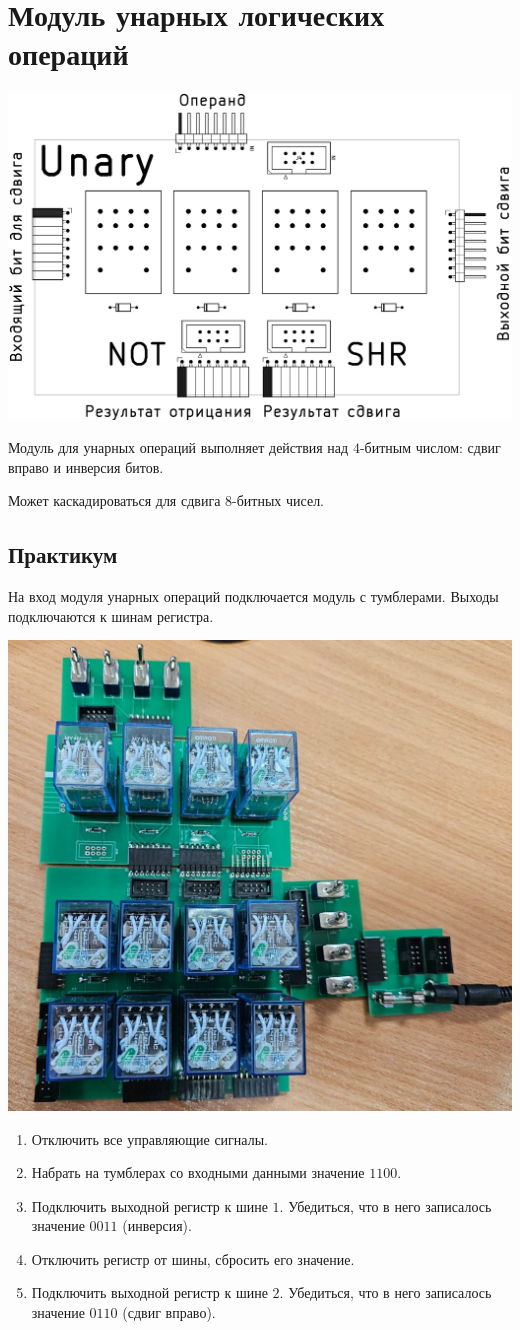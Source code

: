 \section{Модуль унарных логических операций}

\begin{center}
\includegraphics{boards/logic_unary.png}
\end{center}

Модуль для унарных операций выполняет действия над $4$-битным числом: сдвиг вправо и инверсия битов.

Может каскадироваться для сдвига $8$-битных чисел.

\subsection{Практикум}

На вход модуля унарных операций подключается модуль с тумблерами.
Выходы подключаются к шинам регистра.


\includegraphics[width=0.5\columnwidth]{photo/unary.jpg}

\begin{enumerate}
    \item Отключить все управляющие сигналы.
    \item Набрать на тумблерах со входными данными значение $1100$.
    \item Подключить выходной регистр к шине $1$. Убедиться, что в него записалось значение $0011$ (инверсия).
    \item Отключить регистр от шины, сбросить его значение.
    \item Подключить выходной регистр к шине $2$. Убедиться, что в него записалось значение $0110$ (сдвиг вправо).
\end{enumerate}

